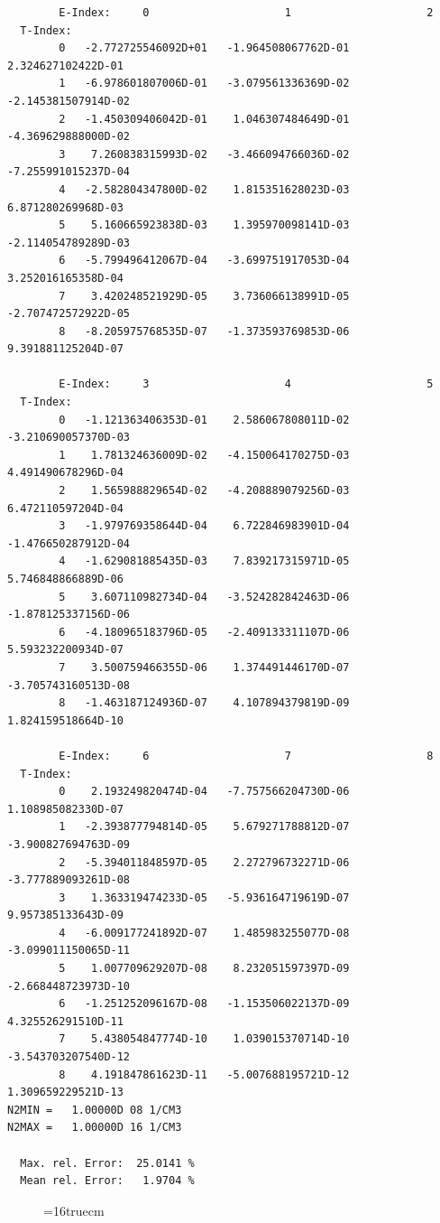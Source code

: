 \documentclass[12pt,dvipdfmx]{article}
\begin{document}
\begin{small}\begin{verbatim}
        E-Index:     0                     1                     2
  T-Index:
        0   -2.772725546092D+01   -1.964508067762D-01    2.324627102422D-01
        1   -6.978601807006D-01   -3.079561336369D-02   -2.145381507914D-02
        2   -1.450309406042D-01    1.046307484649D-01   -4.369629888000D-02
        3    7.260838315993D-02   -3.466094766036D-02   -7.255991015237D-04
        4   -2.582804347800D-02    1.815351628023D-03    6.871280269968D-03
        5    5.160665923838D-03    1.395970098141D-03   -2.114054789289D-03
        6   -5.799496412067D-04   -3.699751917053D-04    3.252016165358D-04
        7    3.420248521929D-05    3.736066138991D-05   -2.707472572922D-05
        8   -8.205975768535D-07   -1.373593769853D-06    9.391881125204D-07

        E-Index:     3                     4                     5
  T-Index:
        0   -1.121363406353D-01    2.586067808011D-02   -3.210690057370D-03
        1    1.781324636009D-02   -4.150064170275D-03    4.491490678296D-04
        2    1.565988829654D-02   -4.208889079256D-03    6.472110597204D-04
        3   -1.979769358644D-04    6.722846983901D-04   -1.476650287912D-04
        4   -1.629081885435D-03    7.839217315971D-05    5.746848866889D-06
        5    3.607110982734D-04   -3.524282842463D-06   -1.878125337156D-06
        6   -4.180965183796D-05   -2.409133311107D-06    5.593232200934D-07
        7    3.500759466355D-06    1.374491446170D-07   -3.705743160513D-08
        8   -1.463187124936D-07    4.107894379819D-09    1.824159518664D-10

        E-Index:     6                     7                     8
  T-Index:
        0    2.193249820474D-04   -7.757566204730D-06    1.108985082330D-07
        1   -2.393877794814D-05    5.679271788812D-07   -3.900827694763D-09
        2   -5.394011848597D-05    2.272796732271D-06   -3.777889093261D-08
        3    1.363319474233D-05   -5.936164719619D-07    9.957385133643D-09
        4   -6.009177241892D-07    1.485983255077D-08   -3.099011150065D-11
        5    1.007709629207D-08    8.232051597397D-09   -2.668448723973D-10
        6   -1.251252096167D-08   -1.153506022137D-09    4.325526291510D-11
        7    5.438054847774D-10    1.039015370714D-10   -3.543703207540D-12
        8    4.191847861623D-11   -5.007688195721D-12    1.309659229521D-13
N2MIN =   1.00000D 08 1/CM3
N2MAX =   1.00000D 16 1/CM3

  Max. rel. Error:  25.0141 %
  Mean rel. Error:   1.9704 %

\end{verbatim}\end{small}
\begin{figure} \label{2.3.18B1}
\epsfxsize=16truecm
\end{figure}
\newpage
\end{document}
